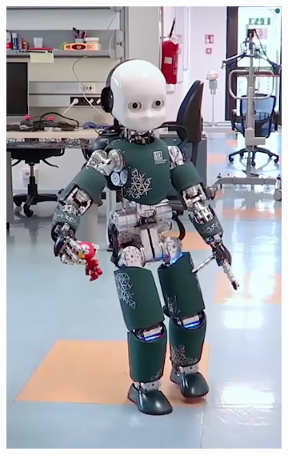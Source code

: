 \begin{figure}[t]
\begin{subfigure}[b]{0.32\textwidth}
        \includegraphics[width=\columnwidth]{chapter_simplified_benchmarking/figures/step2.png}
    \end{subfigure}
    \hfill
           \begin{subfigure}[b]{0.32\textwidth}
        \centering

\end{subfigure}
\end{figure}
